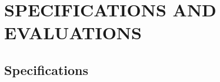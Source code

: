 \documentclass[]{article}
\begin{document}
% 
% 


\section{SPECIFICATIONS AND EVALUATIONS}
\label{sec:functional_requirements}

\subsection{Specifications}
\label{sub:user_characteristics}
\end{document}
